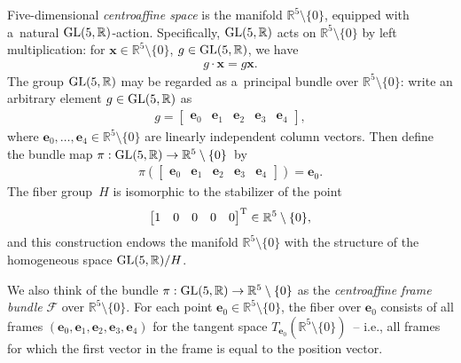 \documentclass[10pt,a4paper]{amsart}
\numberwithin{equation}{section}
\theoremstyle{definition}
\begin{document}
Five-dimensional {\em centroaffine space} is the manifold $\mathbb{R}^5 \setminus \{0\}$, equipped with a~natural ${\rm
GL}(5,\mathbb{R})$-action.
Specif\/ically, ${\rm GL}(5, \mathbb{R})$ acts on $\mathbb{R}^5 \setminus \{0\}$ by left multiplication: for $\mathbf{x}
\in \mathbb{R}^5 \setminus \{0\}$, $g \in {\rm GL}(5, \mathbb{R})$, we have
\begin{gather*}
g \cdot \mathbf{x} = g\mathbf{x}.
\end{gather*}
The group ${\rm GL}(5,\mathbb{R})$ may be regarded as a~principal bundle over $\mathbb{R}^5 \setminus \{0\}$: write an
arbitrary element $g\in {\rm GL}(5,\mathbb{R})$ as
\begin{gather*}
g =
\begin{bmatrix}
\mathbf{e}_0 & \mathbf{e}_1 & \mathbf{e}_2 & \mathbf{e}_3 & \mathbf{e}_4
\end{bmatrix},
\end{gather*}
where $\mathbf{e}_0, \ldots, \mathbf{e}_4 \in \mathbb{R}^5 \setminus \{0\}$ are linearly independent column vectors.
Then def\/ine the bundle map $\pi:{\rm GL}(5,\mathbb{R}) \to \mathbb{R}^5 \setminus \{0\}$~by
\begin{gather}
\pi \left(
\begin{bmatrix}
\mathbf{e}_0 & \mathbf{e}_1 & \mathbf{e}_2 & \mathbf{e}_3 & \mathbf{e}_4
\end{bmatrix}
\right) = \mathbf{e}_0.
\label{define-pi}
\end{gather}
The f\/iber group~$H$ is isomorphic to the stabilizer of the point
\begin{gather*}
\begin{bmatrix}
1 & 0 & 0 & 0 & 0
\end{bmatrix}^{\rm T} \in \mathbb{R}^5 \setminus \{0\},
\end{gather*}
and this construction endows the manifold $\mathbb{R}^5 \setminus \{0\}$ with the structure of the homogeneous space
${\rm GL}(5,\mathbb{R})/H$.

We also think of the bundle $\pi:{\rm GL}(5,\mathbb{R}) \to \mathbb{R}^5 \setminus \{0\}$ as the {\em centroaffine frame
bundle} $\mathcal{F}$ over $\mathbb{R}^5 \setminus \{0\}$.
For each point $\mathbf{e}_0 \in \mathbb{R}^5 \setminus \{0\}$, the f\/iber over $\mathbf{e}_0$ consists of all frames
$(\mathbf{e}_0, \mathbf{e}_1, \mathbf{e}_2, \mathbf{e}_3, \mathbf{e}_4)$ for the tangent space
$T_{\mathbf{e}_0}(\mathbb{R}^5 \setminus \{0\})$~-- i.e., all frames for which the f\/irst vector in the frame is equal to
the position vector.
\end{document}
